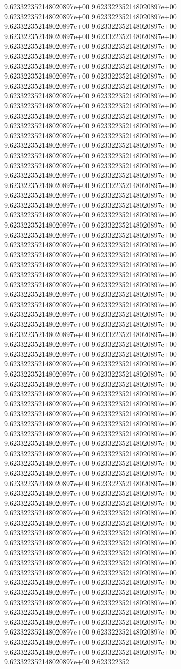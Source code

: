 9.623322352148020897e+00	9.623322352148020897e+00	9.623322352148020897e+00	9.623322352148020897e+00	9.623322352148020897e+00	9.623322352148020897e+00	9.623322352148020897e+00	9.623322352148020897e+00	9.623322352148020897e+00	9.623322352148020897e+00	9.623322352148020897e+00	9.623322352148020897e+00	9.623322352148020897e+00	9.623322352148020897e+00	9.623322352148020897e+00	9.623322352148020897e+00	9.623322352148020897e+00	9.623322352148020897e+00	9.623322352148020897e+00	9.623322352148020897e+00	9.623322352148020897e+00	9.623322352148020897e+00	9.623322352148020897e+00	9.623322352148020897e+00	9.623322352148020897e+00	9.623322352148020897e+00	9.623322352148020897e+00	9.623322352148020897e+00	9.623322352148020897e+00	9.623322352148020897e+00	9.623322352148020897e+00	9.623322352148020897e+00	9.623322352148020897e+00	9.623322352148020897e+00	9.623322352148020897e+00	9.623322352148020897e+00	9.623322352148020897e+00	9.623322352148020897e+00	9.623322352148020897e+00	9.623322352148020897e+00	9.623322352148020897e+00	9.623322352148020897e+00	9.623322352148020897e+00	9.623322352148020897e+00	9.623322352148020897e+00	9.623322352148020897e+00	9.623322352148020897e+00	9.623322352148020897e+00	9.623322352148020897e+00	9.623322352148020897e+00	9.623322352148020897e+00	9.623322352148020897e+00	9.623322352148020897e+00	9.623322352148020897e+00	9.623322352148020897e+00	9.623322352148020897e+00	9.623322352148020897e+00	9.623322352148020897e+00	9.623322352148020897e+00	9.623322352148020897e+00	9.623322352148020897e+00	9.623322352148020897e+00	9.623322352148020897e+00	9.623322352148020897e+00	9.623322352148020897e+00	9.623322352148020897e+00	9.623322352148020897e+00	9.623322352148020897e+00	9.623322352148020897e+00	9.623322352148020897e+00	9.623322352148020897e+00	9.623322352148020897e+00	9.623322352148020897e+00	9.623322352148020897e+00	9.623322352148020897e+00	9.623322352148020897e+00	9.623322352148020897e+00	9.623322352148020897e+00	9.623322352148020897e+00	9.623322352148020897e+00	9.623322352148020897e+00	9.623322352148020897e+00	9.623322352148020897e+00	9.623322352148020897e+00	9.623322352148020897e+00	9.623322352148020897e+00	9.623322352148020897e+00	9.623322352148020897e+00	9.623322352148020897e+00	9.623322352148020897e+00	9.623322352148020897e+00	9.623322352148020897e+00	9.623322352148020897e+00	9.623322352148020897e+00	9.623322352148020897e+00	9.623322352148020897e+00	9.623322352148020897e+00	9.623322352148020897e+00	9.623322352148020897e+00	9.623322352148020897e+00	9.623322352148020897e+00	9.623322352148020897e+00	9.623322352148020897e+00	9.623322352148020897e+00	9.623322352148020897e+00	9.623322352148020897e+00	9.623322352148020897e+00	9.623322352148020897e+00	9.623322352148020897e+00	9.623322352148020897e+00	9.623322352148020897e+00	9.623322352148020897e+00	9.623322352148020897e+00	9.623322352148020897e+00	9.623322352148020897e+00	9.623322352148020897e+00	9.623322352148020897e+00	9.623322352148020897e+00	9.623322352148020897e+00	9.623322352148020897e+00	9.623322352148020897e+00	9.623322352148020897e+00	9.623322352148020897e+00	9.623322352148020897e+00	9.623322352148020897e+00	9.623322352148020897e+00	9.623322352148020897e+00	9.623322352148020897e+00	9.623322352148020897e+00	9.623322352148020897e+00	9.623322352148020897e+00	9.623322352148020897e+00	9.623322352148020897e+00	9.623322352